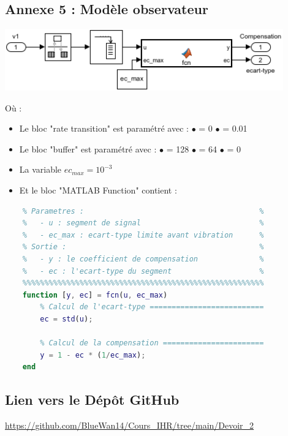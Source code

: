 \documentclass[a4paper,12pt]{article}
\begin{document}
    \subsection{Annexe 5 : Modèle observateur} \label{Annexe:modelObs}
    \begin{center}
        \includegraphics[width=12cm]{./img/model_observateur.png}
    \end{center}
    Où :
    \begin{itemize}
        \item[] Le bloc "rate transition" est paramétré avec : 
            \subitem $\bullet$  = 0
            \subitem $\bullet$  = 0.01
        \item[] Le bloc "buffer" est paramétré avec : 
            \subitem$\bullet$  = 128
            \subitem$\bullet$  = 64
            \subitem$\bullet$  = 0
        \item[] La variable $ec_{max} = 10^{-3}$
        \item[] Et le bloc "MATLAB Function" contient :
    \end{itemize}
    \begin{lstlisting}[caption={Fonction simulink de calcul du compensateur}, language=Matlab]
    %%%%%%%%%%%%%%%%%%%%%%%%%%%%%%%%%%%%%%%%%%%%%%%%%%%%%%%
    % Parametres :                                        %
    %   - u : segment de signal                           %
    %   - ec_max : ecart-type limite avant vibration      %
    % Sortie :                                            %
    %   - y : le coefficient de compensation              %
    %   - ec : l'ecart-type du segment                    %
    %%%%%%%%%%%%%%%%%%%%%%%%%%%%%%%%%%%%%%%%%%%%%%%%%%%%%%%
    function [y, ec] = fcn(u, ec_max)
        % Calcul de l'ecart-type ==========================
        ec = std(u);

        % Calcul de la compensation =======================
        y = 1 - ec * (1/ec_max);
    end
    \end{lstlisting}
    
    
    \subsection{Lien vers le Dépôt GitHub}
    \url{https://github.com/BlueWan14/Cours_IHR/tree/main/Devoir_2}
    
\end{document}
